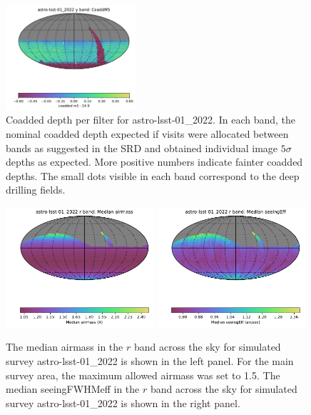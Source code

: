 \documentclass[DM,lsstdraft,authoryear,toc]{lsstdoc}
\begin{document}
\begin{figure}[ht]
\includegraphics[width=0.43\textwidth]{figures/astro-lsst-01_2022_CoaddM5_y_band_HEAL_SkyMap}
\caption{Coadded depth per filter for astro-lsst-01\_2022. In each band, the nominal coadded depth expected if
visits were allocated between bands as suggested in the SRD and obtained individual image $5\sigma$ depths 
as expected. More positive numbers indicate fainter coadded depths. The small dots visible in each band correspond
to the deep drilling fields.
\label{fig:baseline_coadd}}
\end{figure}

\begin{figure}[ht]
\centering
\includegraphics[width=0.49\textwidth]{figures/astro-lsst-01_2022_Median_airmass_r_band_HEAL_SkyMap}
\includegraphics[width=0.49\textwidth]{figures/astro-lsst-01_2022_Median_seeingEff_r_band_HEAL_SkyMap}
\caption{The median airmass in the $r$ band across the sky for simulated survey
astro-lsst-01\_2022 is shown in the left panel. For the main survey area, the maximum
allowed airmass was set to 1.5. The median seeingFWHMeff in the $r$ band across the sky 
for simulated survey astro-lsst-01\_2022 is shown in the right panel.}
\label{fig:baseline_airmass}
\end{figure}
\end{document}
